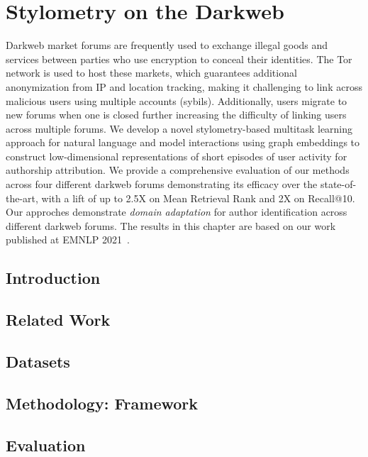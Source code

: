 \chapter{Stylometry on the Darkweb}
\label{chp:sysml}

Darkweb market forums are frequently used to exchange illegal goods and services between parties who use encryption to conceal their identities. The Tor network is used to host these markets, which guarantees additional anonymization from IP and location tracking, making it challenging to link across malicious users using multiple accounts (sybils). Additionally, users migrate to new forums when one is closed further increasing the difficulty of linking users across multiple forums. We develop a novel stylometry-based multitask learning approach for natural language and model interactions using graph embeddings to construct low-dimensional representations of short episodes of user activity for authorship attribution. We provide a comprehensive evaluation of our methods across four different darkweb forums demonstrating its efficacy over the state-of-the-art, with a lift of up to 2.5X on Mean Retrieval Rank and 2X on Recall@10.
Our approches demonstrate \emph{domain adaptation} for author identification across different darkweb forums.
The results in this chapter are based on our work published at EMNLP 2021~\cite{maneriker2021sysml}.


\section{Introduction}


\section{Related Work}


\section{Datasets}


\section{Methodology: \SYSMLmethodname{} Framework}



\section{Evaluation}


